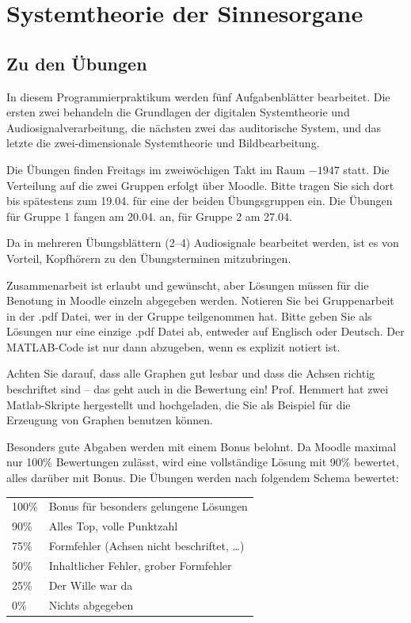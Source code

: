\section*{Systemtheorie der Sinnesorgane}
\subsection{Zu den Übungen}
In diesem Programmierpraktikum werden fünf Aufgabenblätter bearbeitet. Die ersten zwei behandeln die Grundlagen der digitalen Systemtheorie und Audiosignalverarbeitung, die nächsten zwei das auditorische System, und das letzte die zwei-dimensionale Systemtheorie und Bildbearbeitung. 

Die Übungen finden Freitags im zweiwöchigen Takt im Raum $-1947$ statt. Die Verteilung auf die zwei Gruppen erfolgt über Moodle. Bitte tragen Sie sich dort bis spätestens zum 19.04. für eine der beiden Übungsgruppen ein. Die Übungen für Gruppe 1 fangen am 20.04. an, für Gruppe 2 am 27.04.

Da in mehreren Übungsblättern (2--4) Audiosignale bearbeitet werden, ist es von Vorteil, Kopfhörern zu den Übungsterminen mitzubringen.

Zusammenarbeit ist erlaubt und gewünscht, aber Lösungen müssen für die Benotung in Moodle einzeln abgegeben werden. Notieren Sie bei Gruppenarbeit in der .pdf Datei, wer in der Gruppe teilgenommen hat.
Bitte geben Sie als Lösungen nur eine einzige .pdf Datei ab, entweder auf Englisch oder Deutsch. 
Der MATLAB-Code ist nur dann abzugeben, wenn es explizit notiert ist. 

Achten Sie darauf, dass alle Graphen gut lesbar und dass die Achsen richtig beschriftet sind -- das geht auch in die Bewertung ein! Prof. Hemmert hat zwei Matlab-Skripte hergestellt und hochgeladen, die Sie als Beispiel für die Erzeugung von Graphen benutzen können.

Besonders gute Abgaben werden mit einem Bonus belohnt. Da Moodle maximal nur 100\% Bewertungen zulässt, wird eine vollständige Lösung mit 90\% bewertet, alles darüber mit Bonus. Die Übungen werden nach folgendem Schema bewertet:

\begin{table}[h!]
\centering
\begin{tabular}{ll}
100\% & Bonus für besonders gelungene Lösungen       \\
90\%  & Alles Top, volle Punktzahl                   \\
75\%  & Formfehler (Achsen nicht beschriftet, \dots) \\
50\%  & Inhaltlicher Fehler, grober Formfehler       \\
25\%  & Der Wille war da                             \\
0\%   & Nichts abgegeben                             \\
\end{tabular}
\end{table}


